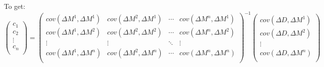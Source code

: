 To get:
\begin{equation}
    \begin{pmatrix}
	c_1 \\
	c_2 \\
	\vdots	\\
	c_n \\ 
    \end{pmatrix}
    =
    \begin{pmatrix}
	cov(\Delta M^1, \Delta M^1) & cov(\Delta M^2, \Delta M^1)   & \cdots & cov(\Delta M^n, \Delta M^1)  \\
	cov(\Delta M^1, \Delta M^2) & cov(\Delta M^2, \Delta M^2)   & \cdots & cov(\Delta M^n, \Delta M^2)  \\
	\vdots	& \vdots    & \ddots	& \vdots    \\
	cov(\Delta M^1, \Delta M^n) & cov(\Delta M^2, \Delta M^n)   & \cdots & cov(\Delta M^n, \Delta M^n)  \\
    \end{pmatrix}^{-1}
    \begin{pmatrix}
	cov(\Delta D, \Delta M^1)   \\
	cov(\Delta D, \Delta M^2)   \\
	\vdots	\\
	cov(\Delta D, \Delta M^n)   \\
    \end{pmatrix}
\end{equation}

